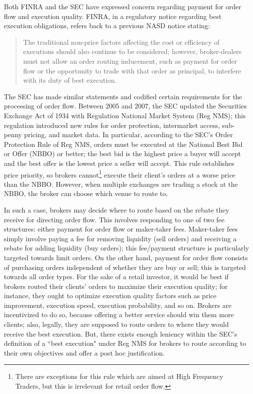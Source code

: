 \documentclass[12pt,a4paper]{extarticle}
\begin{document}
Both FINRA and the SEC have expressed concern regarding payment for order flow and execution quality. FINRA, in a regulatory notice \citeyearpar{FINRA notice} regarding best execution obligations, refers back to a previous NASD notice stating:

\begin{quote}
	The traditional non-price factors affecting the cost or efficiency of executions should also continue to be considered; however, broker-dealers must not allow an order routing inducement, such as payment for order flow or the opportunity to trade with that order as principal, to interfere with its duty of best execution. \citeyearpar{NASD}
\end{quote}
The SEC has made similar statements and codified certain requirements for the processing of order flow. Between 2005 and 2007, the SEC updated the Securities Exchange Act of 1934 with Regulation National Market System (Reg NMS); this regulation introduced new rules for order protection, intermarket access, sub-penny pricing, and market data. In particular, according to the SEC's Order Protection Rule of Reg NMS, orders must be executed at the National Best Bid or Offer (NBBO) or better; the best bid is the highest price a buyer will accept and the best offer is the lowest price a seller will accept. This rule establishes price priority, so brokers cannot\footnote{ There are exceptions for this rule which are aimed at High Frequency Traders, but this is irrelevant for retail order flow.} execute their client's orders at a worse price than the NBBO. However, when multiple exchanges are trading a stock at the NBBO, the broker can choose which venue to route to. 

In such a case, brokers may decide where to route based on the rebate they receive for directing order flow. This involves responding to one of two fee structures: either payment for order flow or maker-taker fees. Maker-taker fees simply involve paying a fee for removing liquidity (sell orders) and receiving a rebate for adding liquidity (buy orders); this fee/payment structure is particularly targeted towards limit orders. On the other hand, payment for order flow consists of purchasing orders independent of whether they are buy or sell; this is targeted towards all order types. 
For the sake of a retail investor, it would be best if brokers routed their clients' orders to maximize their execution quality; 
for instance, they ought to optimize execution quality factors such as price improvement, execution speed, execution probability, and so on. Brokers are incentivized to do so, because offering a better service should win them more clients; also, legally, they are supposed to route orders to where they would receive the best execution. But, there exists enough leniency within the SEC's definition of a ``best execution" under Reg NMS for brokers to route according to their own objectives and offer a post hoc justification. 
\end{document}
